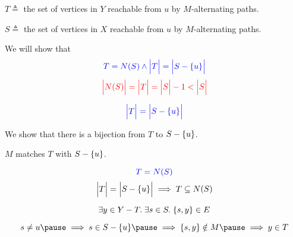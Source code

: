 \begin{frame}{}
  \begin{center}

    \vspace{0.50cm}
    $T \triangleq$ the set of vertices in $Y$ reachable from $u$ by $M$-alternating paths.

    \pause
    \vspace{0.20cm}
    $S \triangleq$ the set of vertices in $X$ reachable from $u$ by $M$-alternating paths.

    \pause
    \vspace{0.60cm}
    We will show that
    \[
      \textcolor{blue}{T = N(S) \land \Big\lvert T \Big\rvert = \Big\lvert S - \{u\} \Big\rvert}
    \]
    \pause
    \[
      \textcolor{red}{\Big\lvert N(S) \Big\rvert = \Big\lvert T \Big\rvert = \Big\lvert S \Big\rvert - 1 < \Big\lvert S \Big\rvert}
    \]
  \end{center}
\end{frame}

\begin{frame}{}
  \begin{center}
    \[
      \textcolor{blue}{\Big\lvert T \Big\rvert = \Big\lvert S - \{u\} \Big\rvert}
    \]

    \pause
    \vspace{0.30cm}
    We show that there is a bijection from $T$ to $S - \{u\}$.

    \pause
    $M$ matches $T$ with $S - \{u\}$.
  \end{center}
\end{frame}

\begin{frame}{}
  \begin{center}
    \[
      \textcolor{blue}{T = N(S)}
    \]
    \pause
    \[
      \Big\lvert T \Big\rvert = \Big\lvert S - \{u\} \Big\rvert \implies T \subseteq N(S)
    \]

    \pause
    \pause
    \[
      \exists y \in Y - T.\; \exists s \in S.\; \{s, y\} \in E
    \]

    \pause
    \[
      s \neq u \pause \implies s \in S - \set{u} \pause
                      \implies \set{s, y} \notin M \pause
                      \implies y \in T
    \]
  \end{center}
\end{frame}

